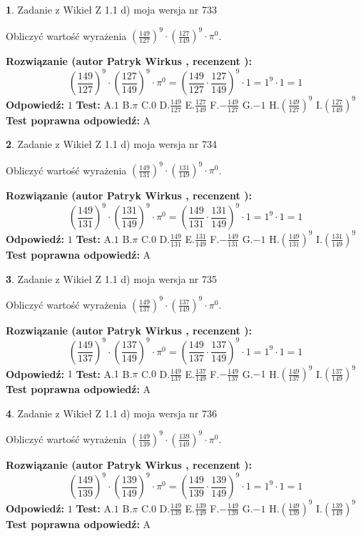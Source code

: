 \documentclass[12pt, a4paper]{article}
\theoremstyle{definition} %
\newtheorem{zad}{}
\newcommand{\zadStart}[1]{\begin{zad}#1\newline}
\newcommand{\zadStop}{\end{zad}}
\newcommand{\rozwStart}[2]{\noindent \textbf{Rozwiązanie (autor #1 , recenzent #2): }\newline}
\newcommand{\rozwStop}{\newline}
\newcommand{\odpStart}{\noindent \textbf{Odpowiedź:}\newline}
\newcommand{\odpStop}{\newline}
\newcommand{\testStart}{\noindent \textbf{Test:}\newline}
\newcommand{\testStop}{\newline}
\newcommand{\kluczStart}{\noindent \textbf{Test poprawna odpowiedź:}\newline}
\newcommand{\kluczStop}{\newline}
\begin{document}
\zadStart{Zadanie z Wikieł Z 1.1 d) moja wersja nr 733}

Obliczyć wartość wyrażenia $(\frac{149}{127})^{9} \cdot (\frac{127}{149})^{9} \cdot \pi^{0}$.
\zadStop
\rozwStart{Patryk Wirkus}{}
$$(\frac{149}{127})^{9} \cdot (\frac{127}{149})^{9} \cdot \pi^{0} = (\frac{149}{127} \cdot \frac{127}{149})^{9} \cdot 1 = 1^{9} \cdot 1 = 1$$
\rozwStop
\odpStart
$1$
\odpStop
\testStart
A.$1$ B.$\pi$ C.$0$ D.$\frac{149}{127}$ E.$\frac{127}{149}$
F.$-\frac{149}{127}$ G.$-1$
H.$(\frac{149}{127})^{9}$
I.$(\frac{127}{149})^{9}$
\testStop
\kluczStart
A
\kluczStop



\zadStart{Zadanie z Wikieł Z 1.1 d) moja wersja nr 734}

Obliczyć wartość wyrażenia $(\frac{149}{131})^{9} \cdot (\frac{131}{149})^{9} \cdot \pi^{0}$.
\zadStop
\rozwStart{Patryk Wirkus}{}
$$(\frac{149}{131})^{9} \cdot (\frac{131}{149})^{9} \cdot \pi^{0} = (\frac{149}{131} \cdot \frac{131}{149})^{9} \cdot 1 = 1^{9} \cdot 1 = 1$$
\rozwStop
\odpStart
$1$
\odpStop
\testStart
A.$1$ B.$\pi$ C.$0$ D.$\frac{149}{131}$ E.$\frac{131}{149}$
F.$-\frac{149}{131}$ G.$-1$
H.$(\frac{149}{131})^{9}$
I.$(\frac{131}{149})^{9}$
\testStop
\kluczStart
A
\kluczStop



\zadStart{Zadanie z Wikieł Z 1.1 d) moja wersja nr 735}

Obliczyć wartość wyrażenia $(\frac{149}{137})^{9} \cdot (\frac{137}{149})^{9} \cdot \pi^{0}$.
\zadStop
\rozwStart{Patryk Wirkus}{}
$$(\frac{149}{137})^{9} \cdot (\frac{137}{149})^{9} \cdot \pi^{0} = (\frac{149}{137} \cdot \frac{137}{149})^{9} \cdot 1 = 1^{9} \cdot 1 = 1$$
\rozwStop
\odpStart
$1$
\odpStop
\testStart
A.$1$ B.$\pi$ C.$0$ D.$\frac{149}{137}$ E.$\frac{137}{149}$
F.$-\frac{149}{137}$ G.$-1$
H.$(\frac{149}{137})^{9}$
I.$(\frac{137}{149})^{9}$
\testStop
\kluczStart
A
\kluczStop



\zadStart{Zadanie z Wikieł Z 1.1 d) moja wersja nr 736}

Obliczyć wartość wyrażenia $(\frac{149}{139})^{9} \cdot (\frac{139}{149})^{9} \cdot \pi^{0}$.
\zadStop
\rozwStart{Patryk Wirkus}{}
$$(\frac{149}{139})^{9} \cdot (\frac{139}{149})^{9} \cdot \pi^{0} = (\frac{149}{139} \cdot \frac{139}{149})^{9} \cdot 1 = 1^{9} \cdot 1 = 1$$
\rozwStop
\odpStart
$1$
\odpStop
\testStart
A.$1$ B.$\pi$ C.$0$ D.$\frac{149}{139}$ E.$\frac{139}{149}$
F.$-\frac{149}{139}$ G.$-1$
H.$(\frac{149}{139})^{9}$
I.$(\frac{139}{149})^{9}$
\testStop
\kluczStart
A
\kluczStop
\end{document}
